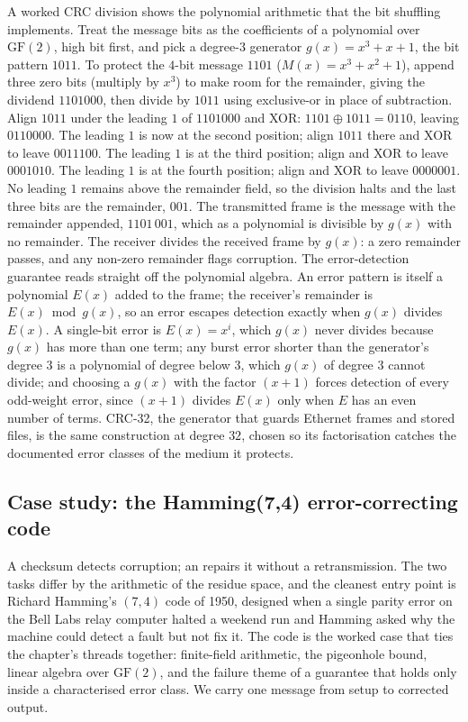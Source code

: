 A worked CRC division shows the polynomial arithmetic that the bit
shuffling implements. Treat the message bits as the coefficients of a
polynomial over $\mathrm{GF}(2)$, high bit first, and pick a degree-$3$
generator $g(x) = x^{3} + x + 1$, the bit pattern $1011$. To protect
the $4$-bit message $1101$ ($M(x) = x^{3} + x^{2} + 1$), append three
zero bits (multiply by $x^{3}$) to make room for the remainder, giving
the dividend $1101000$, then divide by $1011$ using exclusive-or in
place of subtraction. Align $1011$ under the leading $1$ of
$1101000$ and XOR: $1101 \oplus 1011 = 0110$, leaving $0110000$. The
leading $1$ is now at the second position; align $1011$ there and XOR
to leave $0011100$. The leading $1$ is at the third position; align
and XOR to leave $0001010$. The leading $1$ is at the fourth position;
align and XOR to leave $0000001$. No leading $1$ remains above the
remainder field, so the division halts and the last three bits are the
remainder, $001$. The transmitted frame is the message with the
remainder appended, $1101\,001$, which as a polynomial is divisible by
$g(x)$ with no remainder. The receiver
divides the received frame by $g(x)$: a zero remainder passes, and any
non-zero remainder flags corruption. The error-detection guarantee
reads straight off the polynomial algebra. An error pattern is itself
a polynomial $E(x)$ added to the frame; the receiver's remainder is
$E(x) \bmod g(x)$, so an error escapes detection exactly when $g(x)$
divides $E(x)$. A single-bit error is $E(x) = x^{i}$, which $g(x)$
never divides because $g(x)$ has more than one term; any burst error
shorter than the generator's degree $3$ is a polynomial of degree
below $3$, which $g(x)$ of degree $3$ cannot divide; and choosing a
$g(x)$ with the factor $(x + 1)$ forces detection of every
odd-weight error, since $(x + 1)$ divides $E(x)$ only when $E$ has an
even number of terms. CRC-32, the generator that guards Ethernet
frames and stored files, is the same construction at degree $32$,
chosen so its factorisation catches the documented error classes of
the medium it protects.

\subsection{Case study: the Hamming(7,4) error-correcting code}

A checksum detects corruption; an 
repairs it without a retransmission. The two tasks differ by the
arithmetic of the residue space, and the cleanest entry point is
Richard Hamming's $(7, 4)$ code of 1950, designed when a single
parity error on the Bell Labs relay computer halted a weekend run
and Hamming asked why the machine could detect a fault but not fix
it. The code is the worked case that ties the chapter's threads
together: finite-field arithmetic, the pigeonhole bound, linear
algebra over $\mathrm{GF}(2)$, and the failure theme of a guarantee
that holds only inside a characterised error class. We carry one
message from setup to corrected output.

